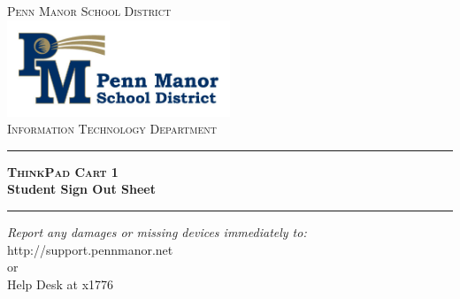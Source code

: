 \begin{titlepage}

\begin{center}

\textsc{\LARGE Penn Manor School District}\\[1.5cm]


\includegraphics[width=0.5\textwidth]{images/logo}\\[1cm]    


\textsc{\Large Information Technology Department}\\[0.5cm]


\hrule 
{ \huge \bfseries \textsc{ThinkPad Cart} 1\\ \vspace{0.5cm} Student Sign Out Sheet}\\[0.4cm]

\hrule 


\vfill
\begin{center} \large
\emph{Report any damages or missing devices immediately to:}\\
http://support.pennmanor.net \\or\\Help Desk at x1776
\end{center}


\vfill

\end{center}

\end{titlepage}